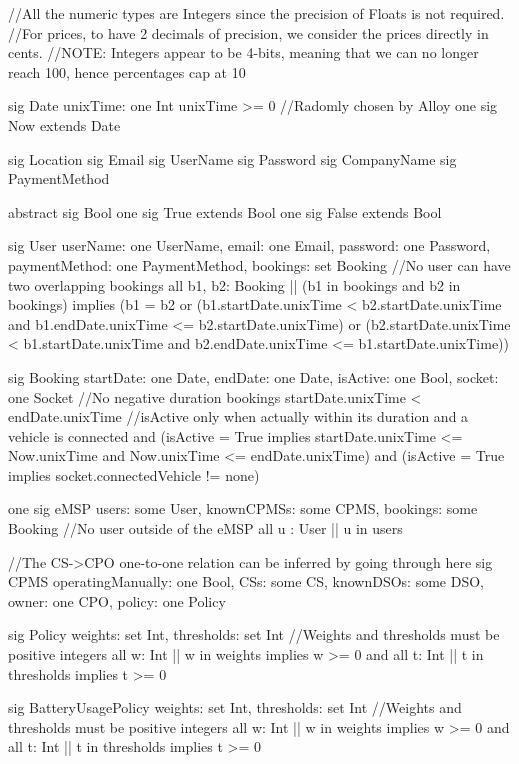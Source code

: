 \documentclass[11pt]{article}
\def\code#1{{\texttt{#1}}}
\begin{document}

\begin{ffcode}

//All the numeric types are Integers since the precision of Floats is not required.
//For prices, to have 2 decimals of precision, we consider the prices directly in cents.
//NOTE: Integers appear to be 4-bits, meaning that we can no longer reach 100, hence percentages cap at 10

sig Date {
	unixTime: one Int
} {
	unixTime >= 0
}
//Radomly chosen by Alloy
one sig Now extends Date {}

sig Location {}
sig Email {}
sig UserName {}
sig Password {}
sig CompanyName {}
sig PaymentMethod {}

abstract sig Bool {}
one sig True extends Bool {}
one sig False extends Bool {}

sig User {
	userName: one UserName,
	email: one Email,
	password: one Password,
	paymentMethod: one PaymentMethod,
	bookings: set Booking
} {
	//No user can have two overlapping bookings
	all b1, b2: Booking |\textbar| (b1 in bookings and b2 in bookings)
	implies
	(b1 = b2 or (b1.startDate.unixTime < b2.startDate.unixTime and b1.endDate.unixTime <= b2.startDate.unixTime) or
	(b2.startDate.unixTime < b1.startDate.unixTime and b2.endDate.unixTime <= b1.startDate.unixTime))
}

sig Booking {
	startDate: one Date,
	endDate: one Date,
	isActive: one Bool,
	socket: one Socket
} {
	//No negative duration bookings
	startDate.unixTime < endDate.unixTime
	//isActive only when actually within its duration and a vehicle is connected
	and (isActive = True implies startDate.unixTime <= Now.unixTime and Now.unixTime <= endDate.unixTime)
	and (isActive = True implies socket.connectedVehicle != none)
}

one sig eMSP {
	users: some User,
	knownCPMSs: some CPMS,
	bookings: some Booking
} {
	//No user outside of the eMSP
	all u : User |\textbar| u in users
}

//The CS->CPO one-to-one relation can be inferred by going through here
sig CPMS {
	operatingManually: one Bool,
	CSs: some CS,
	knownDSOs: some DSO,
	owner: one CPO,
	policy: one Policy
}

sig Policy {
	weights: set Int,
	thresholds: set Int
} {
	//Weights and thresholds must be positive integers
	all w: Int |\textbar| w in weights implies w >= 0
	and all t: Int |\textbar| t in thresholds implies t >= 0
}

sig BatteryUsagePolicy {
	weights: set Int,
	thresholds: set Int
} {
	//Weights and thresholds must be positive integers
	all w: Int |\textbar| w in weights implies w >= 0
	and all t: Int |\textbar| t in thresholds implies t >= 0
}


\end{ffcode}
\end{document}
